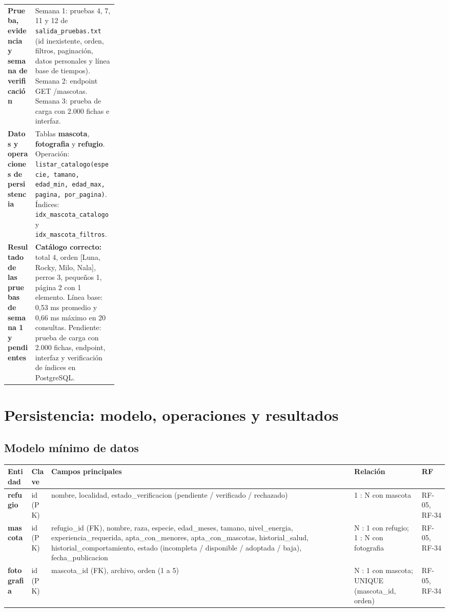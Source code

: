 \documentclass[11pt,a4paper]{article}
\newcommand{\code}[1]{\texttt{#1}}
\newcommand{\thead}[1]{\textbf{#1}}
\begin{document}
{\begin{tabularx}{\linewidth}{@{}A{0.25\linewidth}Y@{}}
\bfseries Prueba, evidencia y semana de verificación &
Semana 1: pruebas 4, 7, 11 y 12 de \code{salida\_pruebas.txt}
(id inexistente, orden, filtros, paginación, datos personales y línea base de tiempos).
Semana 2: endpoint GET /mascotas. Semana 3: prueba de carga con 2.000 fichas e interfaz. \\

\bfseries Datos y operaciones de persistencia &
Tablas \textbf{mascota}, \textbf{fotografia} y \textbf{refugio}.
Operación: \code{listar\_catalogo(especie, tamano, edad\_min, edad\_max, pagina, por\_pagina)}.
Índices: \code{idx\_mascota\_catalogo} y \code{idx\_mascota\_filtros}. \\

\bfseries Resultado de las pruebas de semana 1 y pendientes &
\textbf{Catálogo correcto:} total 4, orden [Luna, Rocky, Milo, Nala],
perros 3, pequeños 1, página 2 con 1 elemento. Línea base: 0,53 ms promedio y 0,66 ms
máximo en 20 consultas. Pendiente: prueba de carga con 2.000 fichas, endpoint, interfaz y
verificación de índices en PostgreSQL. \\
\bottomrule
\end{tabularx}
}

\clearpage

\section{Persistencia: modelo, operaciones y resultados}

\subsection{Modelo mínimo de datos}

{\footnotesize
\begin{tabularx}{\linewidth}{@{}V{0.55}V{0.55}V{1.95}V{1.0}V{0.95}@{}}
\toprule

\thead{Entidad} & \thead{Clave} & \thead{Campos principales} & \thead{Relación} & \thead{RF} \\ \midrule

\textbf{refugio} & id (PK) & nombre, localidad, estado\_verificacion (pendiente / verificado / rechazado) & 1 : N con mascota & RF-05, RF-34 \\
\textbf{mascota} & id (PK) &
refugio\_id (FK), nombre, raza, especie, edad\_meses, tamano, nivel\_energia,
experiencia\_requerida, apta\_con\_menores, apta\_con\_mascotas, historial\_salud,
historial\_comportamiento, estado (incompleta / disponible / adoptada / baja),
fecha\_publicacion &
N : 1 con refugio; 1 : N con fotografia & RF-05, RF-34 \\
\textbf{fotografia} & id (PK) & mascota\_id (FK), archivo, orden (1 a 5) & N : 1 con mascota; UNIQUE (mascota\_id, orden) & RF-05, RF-34 \\
\bottomrule
\end{tabularx}
}
\end{document}
